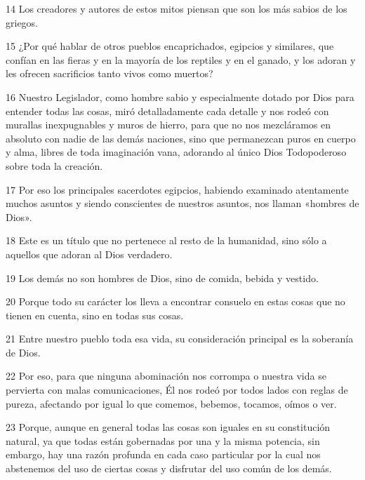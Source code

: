 \par 14 Los creadores y autores de estos mitos piensan que son los más sabios de los griegos.

\par 15 ¿Por qué hablar de otros pueblos encaprichados, egipcios y similares, que confían en las fieras y en la mayoría de los reptiles y en el ganado, y los adoran y les ofrecen sacrificios tanto vivos como muertos?

\par 16 Nuestro Legislador, como hombre sabio y especialmente dotado por Dios para entender todas las cosas, miró detalladamente cada detalle y nos rodeó con murallas inexpugnables y muros de hierro, para que no nos mezcláramos en absoluto con nadie de las demás naciones, sino que permanezcan puros en cuerpo y alma, libres de toda imaginación vana, adorando al único Dios Todopoderoso sobre toda la creación.

\par 17 Por eso los principales sacerdotes egipcios, habiendo examinado atentamente muchos asuntos y siendo conscientes de nuestros asuntos, nos llaman «hombres de Dios».

\par 18 Este es un título que no pertenece al resto de la humanidad, sino sólo a aquellos que adoran al Dios verdadero.

\par 19 Los demás no son hombres de Dios, sino de comida, bebida y vestido.

\par 20 Porque todo su carácter los lleva a encontrar consuelo en estas cosas que no tienen en cuenta, sino en todas sus cosas.

\par 21 Entre nuestro pueblo toda esa vida, su consideración principal es la soberanía de Dios.

\par 22 Por eso, para que ninguna abominación nos corrompa o nuestra vida se pervierta con malas comunicaciones, Él nos rodeó por todos lados con reglas de pureza, afectando por igual lo que comemos, bebemos, tocamos, oímos o ver.

\par 23 Porque, aunque en general todas las cosas son iguales en su constitución natural, ya que todas están gobernadas por una y la misma potencia, sin embargo, hay una razón profunda en cada caso particular por la cual nos abstenemos del uso de ciertas cosas y disfrutar del uso común de los demás.

